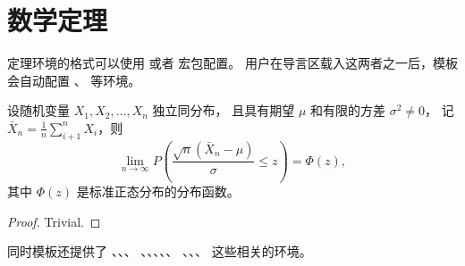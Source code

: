\section{数学定理}

定理环境的格式可以使用  或者  宏包配置。
用户在导言区载入这两者之一后，模板会自动配置 、 等环境。

\begin{theorem}
  设随机变量 $X_1, X_2, \dots, X_n$ 独立同分布， 且具有期望 $\mu$ 和有限的方差 $\sigma^2 \ne 0$，
  记 $\bar{X}_n = \frac{1}{n} \sum_{i+1}^n X_i$，则
  \begin{equation}
    \lim_{n \to \infty} P \left(\frac{\sqrt{n} \left( \bar{X}_n - \mu \right)}{\sigma} \le z \right) = \Phi(z),
  \end{equation}
  其中 $\Phi(z)$ 是标准正态分布的分布函数。
\end{theorem}
\begin{proof}
  Trivial.
\end{proof}

同时模板还提供了 、、、
、、、、、
、、、 这些相关的环境。

\cleardoublepage
